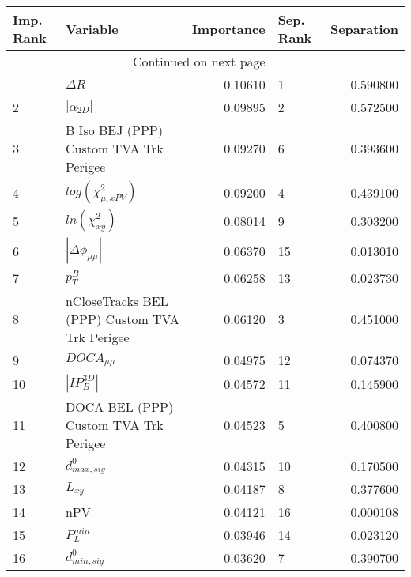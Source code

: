 \usepackage{lscape}

\begin{landscape}
\begin{longtable}{llrlr}
\toprule
Imp. Rank &                                       Variable &  Importance & Sep. Rank &  Separation \\
\midrule
\endhead
\midrule
\multicolumn{3}{r}{{Continued on next page}} \\
\midrule
\endfoot

\bottomrule
\endlastfoot
        1 &                                     $\Delta R$ &     0.10610 &         1 &    0.590800 \\
        2 &                                $|\alpha_{2D}|$ &     0.09895 &         2 &    0.572500 \\
        3 &         B Iso BEJ (PPP) Custom TVA Trk Perigee &     0.09270 &         6 &    0.393600 \\
        4 &                      $log(\chi^{2}_{\mu,xPV})$ &     0.09200 &         4 &    0.439100 \\
        5 &                            $ln(\chi^{2}_{xy})$ &     0.08014 &         9 &    0.303200 \\
        6 &                       $|\Delta \phi_{\mu\mu}|$ &     0.06370 &        15 &    0.013010 \\
        7 &                                      $p^B_{T}$ &     0.06258 &        13 &    0.023730 \\
        8 &  nCloseTracks BEL (PPP) Custom TVA Trk Perigee &     0.06120 &         3 &    0.451000 \\
        9 &                                $DOCA_{\mu\mu}$ &     0.04975 &        12 &    0.074370 \\
       10 &                                $|IP_{B}^{3D}|$ &     0.04572 &        11 &    0.145900 \\
       11 &          DOCA BEL (PPP) Custom TVA Trk Perigee &     0.04523 &         5 &    0.400800 \\
       12 &                               $d^0_{max, sig}$ &     0.04315 &        10 &    0.170500 \\
       13 &                                       $L_{xy}$ &     0.04187 &         8 &    0.377600 \\
       14 &                                            nPV &     0.04121 &        16 &    0.000108 \\
       15 &                                  $P^{min}_{L}$ &     0.03946 &        14 &    0.023120 \\
       16 &                               $d^0_{min, sig}$ &     0.03620 &         7 &    0.390700 \\
\end{longtable}

\end{landscape}
